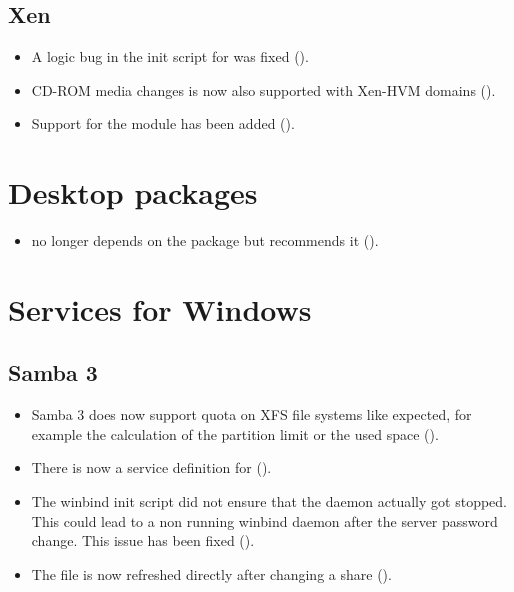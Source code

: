 \subsection{Xen}
\begin{itemize}
\item A logic bug in the init script for  was fixed ().
\item CD-ROM media changes is now also supported with Xen-HVM domains ().
\item Support for the  module has been added ().
\end{itemize}



\section{Desktop packages}
\begin{itemize}
\item {} no longer depends on the package
 but recommends it ().
\end{itemize}


\section{Services for Windows}

\subsection{Samba 3}
\begin{itemize}
\item Samba 3 does now support quota on XFS file systems like expected, for example the calculation of the partition limit or the used space ().
\item There is now a service definition for  ().
\item The winbind init script did not ensure that the daemon actually got stopped. This could lead
 to a non running winbind daemon after the server password change. This issue has been fixed
 ().
\item The file  is now refreshed directly after changing a share ().
\end{itemize}

